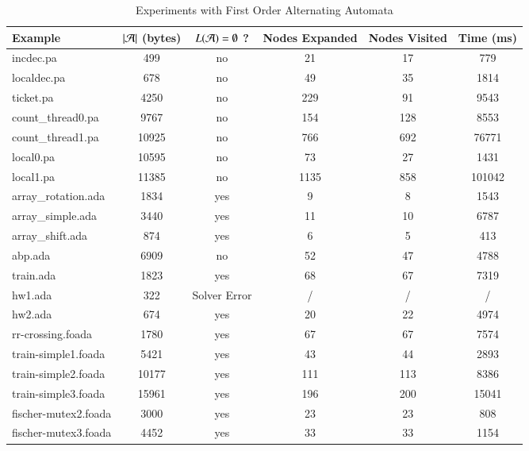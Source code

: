 \begin{table}[htb]
\vspace*{-\baselineskip}
\begin{center}
{\fontsize{7}{8}\selectfont
\begin{tabular}{||l|c|c|c|c|c||}
\hline
Example & ${|{\mathcal{A}}|}$ (bytes) & $L(\mathcal{A})=\emptyset$ ? & Nodes Expanded & Nodes Visited & Time (ms) \\
\hline
incdec.pa & 499 & no & 21 & 17 & 779 \\
\hline
localdec.pa & 678 & no & 49 & 35 & 1814 \\
\hline
ticket.pa & 4250 & no & 229 & 91 & 9543 \\
\hline
count\_thread0.pa & 9767 & no & 154 & 128 & 8553 \\
\hline
count\_thread1.pa & 10925 & no & 766 & 692 & 76771 \\
\hline
local0.pa & 10595 & no & 73 & 27 & 1431 \\
\hline
local1.pa & 11385 & no & 1135 & 858 & 101042 \\
\hline
array\_rotation.ada & 1834 & yes & 9 & 8 & 1543 \\
\hline
array\_simple.ada & 3440 & yes & 11 & 10 & 6787 \\
\hline
array\_shift.ada & 874 & yes & 6 & 5 & 413 \\
\hline
abp.ada & 6909 & no & 52 & 47 & 4788 \\
\hline
train.ada & 1823 & yes & 68 & 67 & 7319 \\
\hline
hw1.ada & 322 & Solver Error & / & / & / \\
\hline
hw2.ada & 674 & yes & 20 & 22 & 4974 \\
\hline
rr-crossing.foada & 1780 & yes & 67 & 67 & 7574 \\
\hline
train-simple1.foada & 5421 & yes & 43 & 44 & 2893 \\
\hline
train-simple2.foada & 10177 & yes & 111 & 113 & 8386 \\
\hline
train-simple3.foada & 15961 & yes & 196 & 200 & 15041 \\
\hline
fischer-mutex2.foada & 3000 & yes & 23 & 23 & 808 \\
\hline
fischer-mutex3.foada & 4452 & yes & 33 & 33 & 1154 \\
\hline
\end{tabular}
}
\caption{Experiments with First Order Alternating Automata}
\label{tab:experiments}
\end{center}
\vspace*{-2\baselineskip}
\end{table}
